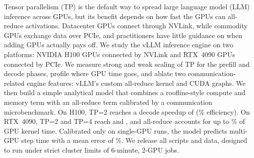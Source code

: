 Tensor parallelism (TP) is the default way to spread large language model (LLM) inference
across GPUs, but its benefit depends on how fast the GPUs can all-reduce activations.
Datacenter GPUs connect through NVLink, while commodity GPUs exchange data over PCIe,
and practitioners have little guidance on when adding GPUs actually pays off.
We study the vLLM inference engine on two platforms: NVIDIA H100 GPUs connected by NVLink
and RTX~4090 GPUs connected by PCIe.
We measure strong and weak scaling of TP for the prefill and decode phases, profile where
GPU time goes, and ablate two communication-related engine features: vLLM's custom
all-reduce kernel and CUDA graphs.
We then build a simple analytical model that combines a roofline-style compute and memory
term with an all-reduce term calibrated by a communication microbenchmark.
On H100, TP=2 reaches a decode speedup of \tbd (\tbd\% efficiency).
On RTX~4090, TP=2 and TP=4 reach \tbd and \tbd, and all-reduce accounts for up to
\tbd\% of GPU kernel time.
Calibrated only on single-GPU runs, the model predicts multi-GPU step time with a mean
error of \tbd\%.
We release all scripts and data, designed to run under strict cluster limits of
6-minute, 2-GPU jobs.
